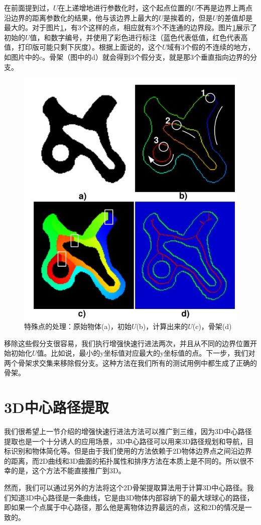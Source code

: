 在前面提到过，$U$在上递增地进行参数化时，这个起点位置的$U$不再是边界上两点沿边界的距离参数化的结果，他与该边界上最大的$U$是挨着的，但是$U$的差值却是最大的。对于图片\ref{special_points}，有3个这样的点，相应就有3个不连通的边界段。图片\ref{special_points}展示了初始的$U$值，和数字编号，并使用了彩色进行标注（蓝色代表低值，红色代表高值，打印版可能只剩下灰度）。根据上面说的，这个$U$域有3个假的不连续的地方，如图片中的c。骨架（图中的d）就会得到3个假分支，就是那3个垂直指向边界的分支。
\begin{figure}[h!]
    \centering
    \includegraphics[height=250bp]{figure/special_points.png}
    \caption{特殊点的处理：原始物体(a)，初始$U$(b)，计算出来的$U$(c)，骨架(d)}
    \label{special_points}
\end{figure}

移除这些假分支很容易，我们执行增强快速行进法两次，并且从不同的边界位置开始初始化$U$值。比如说，最小的y坐标值对应最大的y坐标值的点。下一步，我们对两个骨架求交集来移除假分支。这种方法在我们所有的测试用例中都生成了正确的骨架。

\section{3D中心路径提取}
\label{afmm-3D}
我们很希望上一节介绍的增强快速行进法方法可以推广到三维，因为3D中心路径提取也是一个十分诱人的应用场景，3D中心路径可以用来3D路径规划和导航，目标识别和物体简化等。但是由于我们使用的方法依赖于2D物体边界点之间沿边界的距离，而2D曲线和3D曲面的拓扑属性和排序方法在本质上是不同的。所以很不幸的是，这个方法不能直接推广到3D。

然而，我们可以通过另外的方法将这个2D骨架提取算法用于计算3D中心路径。我们知道3D中心路径是一条曲线，它是由3D物体内部容纳下的最大球球心的路径，即如果一个点属于中心路径，那么他是离物体边界最远的点，这和2D的情况是一致的。

